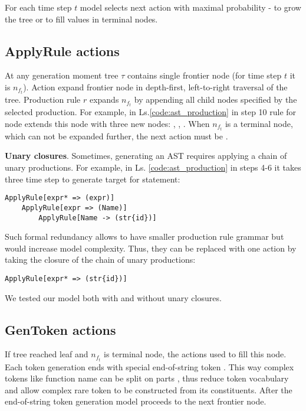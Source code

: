 For each time step $t$ model selects next action with maximal probability -  to grow the tree or  to fill values in terminal nodes. 

\subsection{ApplyRule actions}

At any generation moment tree $\tau$ contains single frontier node (for time step $t$ it is $n_{f_t}$). Action  expand frontier node in depth-first, left-to-right traversal of the tree. Production rule $r$ expands $n_{f_t}$ by appending all child nodes specified by the selected production. For example, in Ls.\ref{code:ast_production} in step 10 rule for node  extends this node with three new nodes: , , . 
When $n_{f_t}$ is a terminal node, which can not be expanded further, the next action must be .

\textbf{Unary closures}. Sometimes, generating an AST requires applying a chain of unary productions. For example, in Ls. \ref{code:ast_production} in steps 4-6 it takes three time step to generate target for  statement:

\begin{verbatim}
ApplyRule[expr* => (expr)]
    ApplyRule[expr => (Name)]
        ApplyRule[Name -> (str{id})]
\end{verbatim}
Such formal redundancy allows to have smaller production rule grammar but would increase model complexity. Thus, they can be replaced with one action by taking the closure of the chain of unary productions:
\begin{verbatim}
ApplyRule[expr* => (str{id})]
\end{verbatim}

We tested our model both with and without unary closures.

\subsection{GenToken actions} \label{gentoken}
If tree reached leaf and $n_{f_t}$ is terminal node, the  actions used to fill this node. Each token generation ends with special end-of-string token . This way complex tokens like function name  can be split on parts , thus reduce token vocabulary and allow complex rare token to be constructed from its constituents. After the end-of-string token generation model proceeds to the next frontier node.

